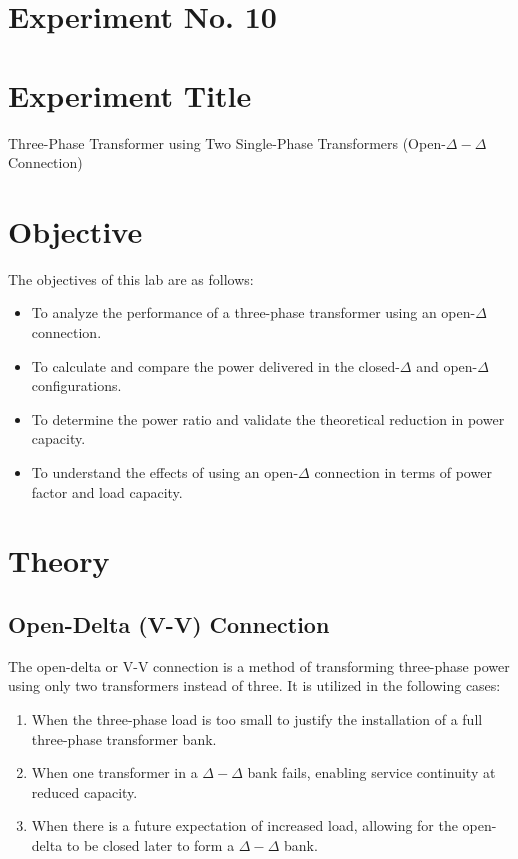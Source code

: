 \documentclass[a4paper,12pt]{article}
\begin{document}
	\section{Experiment No. 10}
	
	\section{Experiment Title }
Three-Phase Transformer using Two Single-Phase Transformers (Open-$\Delta-\Delta$ Connection)
	\section{Objective}
	
	The objectives of this lab are as follows:

\begin{itemize}
	\item To analyze the performance of a three-phase transformer using an open-$\Delta$ connection.
	\item To calculate and compare the power delivered in the closed-$\Delta$ and open-$\Delta$ configurations.
	\item To determine the power ratio and validate the theoretical reduction in power capacity.
	\item To understand the effects of using an open-$\Delta$ connection in terms of power factor and load capacity.
\end{itemize}
	\section{Theory}
	
	\subsection{Open-Delta (V-V) Connection}
	
	The open-delta or V-V connection is a method of transforming three-phase power using only two transformers instead of three. It is utilized in the following cases:
	\begin{enumerate}
		\item When the three-phase load is too small to justify the installation of a full three-phase transformer bank.
		\item When one transformer in a $\Delta-\Delta$ bank fails, enabling service continuity at reduced capacity.
		\item When there is a future expectation of increased load, allowing for the open-delta to be closed later to form a $\Delta-\Delta$ bank.
	\end{enumerate}
	
\end{document}
